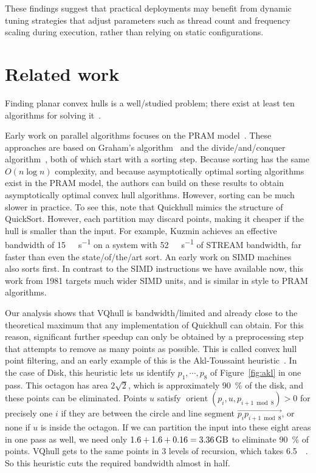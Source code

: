 \documentclass[11pt,a4paper]{article}
\DeclareMathOperator*{\orient}{orient}
\begin{document}
These findings suggest that practical deployments may benefit from dynamic tuning strategies that adjust parameters such as thread count and frequency scaling during execution, rather than relying on static configurations.

\section{Related work}\label{sec:related}
Finding planar convex hulls is a well\-/studied problem; there exist at least ten algorithms for solving it~\cite{graham1972efficient,jarvis1973identification,eddy1977convex,preparata1977convex,bykat1978convex,akl1978fast,andrew1979another,clarkson1993four,barber1996quick,chan1996optimal}.

Early work on parallel algorithms focuses on the PRAM model~\cite{goodrich1987finding,ghouse1991inplace}.
These approaches are based on Graham's algorithm~\cite{graham1972efficient} and the divide\-/and\-/conquer algorithm~\cite{preparata1977convex}, both of which start with a sorting step.
Because sorting has the same $O(n \log n)$ complexity, and because asymptotically optimal sorting algorithms exist in the PRAM model, the authors can build on these results to obtain asymptotically optimal convex hull algorithms.
However, sorting can be much slower in practice.
To see this, note that Quickhull mimics the structure of QuickSort.
However, each partition may discard points, making it cheaper if the hull is smaller than the input.
For example, Kuzmin achieves an effective bandwidth of \qty{15}{\giga\byte\per\second} on a system with \qty{52}{\giga\byte\per\second} of STREAM bandwidth, far faster than even the state\-/of\-/the\-/art sort.
An early work on SIMD machines~\cite{nath1981parallel} also sorts first.
In contrast to the SIMD instructions we have available now, this work from 1981 targets much wider SIMD units, and is similar in style to PRAM algorithms.

Our analysis shows that VQhull is bandwidth\-/limited and already close to the theoretical maximum that any implementation of Quickhull can obtain.
For this reason, significant further speedup can only be obtained by a preprocessing step that attempts to remove as many points as possible.
This is called convex hull point filtering, and an early example of this is the Akl-Toussaint heuristic~\cite{akl1978fast}.
In the case of Disk, this heuristic lets us identify $p_1, \cdots, p_8$ of Figure~\ref{fig:akl} in one pass.
This octagon has area $2\sqrt{2}$, which is approximately \qty{90}{\percent} of the disk, and these points can be eliminated.
Points $u$ satisfy $\orient(p_i, u, p_{i + 1 \bmod 8}) > 0$ for precisely one $i$ if they are between the circle and line segment $\overrightarrow{p_i p_{i + 1 \bmod 8}}$, or none if $u$ is inside the octagon.
If we can partition the input into these eight areas in one pass as well, we need only $1.6 + 1.6 + 0.16 = \qty{3.36}{\giga\byte}$ to eliminate \qty{90}{\percent} of points.
VQhull gets to the same points in 3 levels of recursion, which takes \qty{6.5}{\giga\byte}.
So this heuristic cuts the required bandwidth almost in half.
\end{document}
